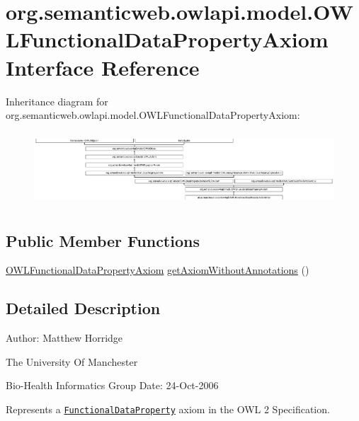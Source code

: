 \hypertarget{interfaceorg_1_1semanticweb_1_1owlapi_1_1model_1_1_o_w_l_functional_data_property_axiom}{\section{org.\-semanticweb.\-owlapi.\-model.\-O\-W\-L\-Functional\-Data\-Property\-Axiom Interface Reference}
\label{interfaceorg_1_1semanticweb_1_1owlapi_1_1model_1_1_o_w_l_functional_data_property_axiom}
}
Inheritance diagram for org.\-semanticweb.\-owlapi.\-model.\-O\-W\-L\-Functional\-Data\-Property\-Axiom\-:\begin{figure}[H]
\begin{center}
\leavevmode
\includegraphics[height=2.775713cm]{interfaceorg_1_1semanticweb_1_1owlapi_1_1model_1_1_o_w_l_functional_data_property_axiom}
\end{center}
\end{figure}
\subsection*{Public Member Functions}
\begin{DoxyCompactItemize}
\item 
\hyperlink{interfaceorg_1_1semanticweb_1_1owlapi_1_1model_1_1_o_w_l_functional_data_property_axiom}{O\-W\-L\-Functional\-Data\-Property\-Axiom} \hyperlink{interfaceorg_1_1semanticweb_1_1owlapi_1_1model_1_1_o_w_l_functional_data_property_axiom_a75af241e85f433515cdff52e1a9350f9}{get\-Axiom\-Without\-Annotations} ()
\end{DoxyCompactItemize}


\subsection{Detailed Description}
Author\-: Matthew Horridge\par
 The University Of Manchester\par
 Bio-\/\-Health Informatics Group Date\-: 24-\/\-Oct-\/2006 

Represents a \href{http://www.w3.org/TR/2009/REC-owl2-syntax-20091027/#Functional_Data_Properties}{\tt Functional\-Data\-Property} axiom in the O\-W\-L 2 Specification. 

